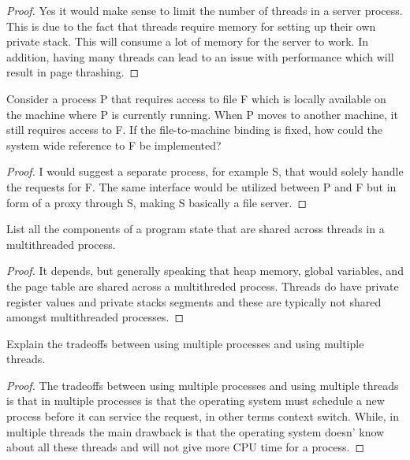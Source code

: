 \documentclass[12pt]{article}
\newenvironment{exercise}[2][Exercise]{\begin{trivlist}
\item[\hskip \labelsep {\bfseries #1}\hskip \labelsep {\bfseries #2.}]}{\end{trivlist}}
\begin{document}
\begin{proof}
Yes it would make sense to limit the number of threads in a server process. This is due to the fact that threads require memory for setting up their own private stack. This will consume a lot of memory for the server to work. In addition, having many threads can lead to an issue with performance which will result in page thrashing. 
\end{proof}
 
\begin{exercise}{4}
Consider a process P that requires access to file F which is locally available on the machine where P is currently running. When P moves to another machine, it still requires access to F. If the file-to-machine binding is fixed, how could the system wide reference to F be implemented?
\end{exercise}

\begin{proof}
I would suggest a separate process, for example S, that would solely handle the requests for F. The same interface would be utilized between P and F but in form of a proxy through S, making S basically a file server. 
\end{proof}

\begin{exercise}{5}
List all the components of a program state that are shared across threads in a multithreaded process.
\end{exercise}

\begin{proof}
It depends, but generally speaking that heap memory, global variables, and the page table are shared across a multithreded process. Threads do have private register values and private stacks segments and these are typically not shared amongst multithreaded processes.
\end{proof}

\begin{exercise}{6}
Explain the tradeoffs between using multiple processes and using multiple threads. 
\end{exercise}

\begin{proof}
The tradeoffs between using multiple processes and using multiple threads is that in multiple processes is that the operating system must schedule a new process before it can service the request, in other terms context switch. While, in multiple threads the main drawback is that the operating system doesn' know about all these threads and will not give more CPU time for a process.
\end{proof}
\end{document}
